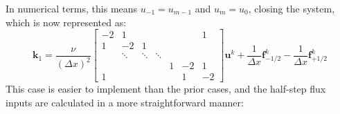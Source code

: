 In numerical terms, this means $u_{-1}=u_{m-1}$ and $u_m=u_0$, closing the system, which is now represented as:
\begin{equation}
    \label{eq:final-periodic}
    \mathbf{k}_1 = \frac{\nu }{(\Delta x)^2}\begin{bmatrix}
                                                -2 & 1      &        &        &   &    & 1  \\
                                                1  & -2     & 1      &        &   &    &    \\
                                                & \ddots & \ddots & \ddots &   &    &    \\
                                                &        &        &        & 1 & -2 & 1  \\
                                                1  &        &        &        &   & 1  & -2
    \end{bmatrix}\mathbf{u}^k
    +\frac{1}{\Delta x}\mathbf{f}_{-1/2}^k-\frac{1}{\Delta x}\mathbf{f}_{+1/2}^k
\end{equation}
This case is easier to implement than the prior cases, and the half-step flux inputs are calculated in a more straightforward manner:
